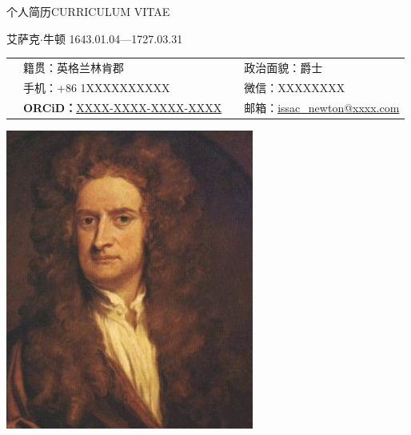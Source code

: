 \documentclass{resume}
\begin{document}
\huge {} 个人简历\hfill CURRICULUM VITAE
\vspace{10pt}

\begin{minipage}{0.8\textwidth}
	\Large {} 艾萨克$\cdot$牛顿
	\small 1643.01.04—1727.03.31\\
	\vspace{3pt}
	
	\hspace{0em}
	\begin{tabular}{m{3pt}<{\centering}m{}<{\raggedright}m{3pt}<{\centering}m{}<{\raggedright}}
	\faMapMarker*  &籍贯：\normalfont 英格兰林肯郡 & \faUserCircle &政治面貌：\normalfont 爵士\\
	\faPhone*&手机：+86 1XXXXXXXXXX    & \faWeixin     &微信：XXXXXXXX\\
	\faOrcid &\textbf{ORCiD：}\href{https://orcid.org/XXXX-XXXX-XXXX-XXXX}{XXXX-XXXX-XXXX-XXXX}
	& \faAt     &邮箱：\href{mailto:issac_newton@xxxx.com}{issac\_newton@xxxx.com}\\
	\end{tabular}
\end{minipage}
\hfill
\begin{minipage}{0.13\textwidth}
	\includegraphics[width=\textwidth]{example.jpg}
\end{minipage}
\end{document}
